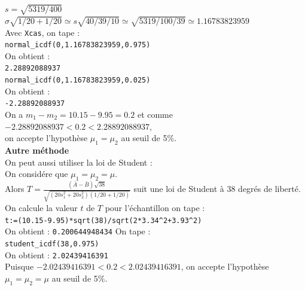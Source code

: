 \documentclass[a4paper,11pt]{book}
\begin{document}
\begin{itemize}
$s=\sqrt{5319/400}$\\
$\sigma\sqrt{1/20+1/20} \simeq s\sqrt{40/39/10}\simeq \sqrt{5319/100/39}\simeq 1.16783823959$\\
Avec {\tt Xcas}, on tape :\\
{\tt normal\_icdf(0,1.16783823959,0.975)}\\
On obtient :\\
{\tt 2.28892088937}\\
{\tt normal\_icdf(0,1.16783823959,0.025)}\\
On obtient :\\
{\tt -2.28892088937}\\
On a $m_1-m_2=10.15-9.95=0.2$ et comme \\
$ -2.28892088937<0.2< 2.28892088937$,\\
 on accepte l'hypoth\`ese $\mu_1=\mu_2$ au seuil de 5\%.\\
{\bf Autre m\'ethode}\\
On peut aussi utiliser la loi de Student :\\
On consid\'ere que $\mu_1=\mu_2=\mu$.\\
Alors $\displaystyle T=\frac{(\bar A- \bar B)\sqrt{38}}{\sqrt{(20s_1^2+20s_2^2)(1/20+1/20)}}$ suit une loi 
de Student \`a 38 degr\'es de libert\'e.\\
On calcule la valeur $t$ de $T$ pour l'\'echantillon on tape  :\\
{\tt t:=(10.15-9.95)*sqrt(38)/sqrt(2*3.34\verb|^|2+3.93\verb|^|2)}\\
On obtient : {\tt 0.200644948434}
On tape :\\
{\tt student\_icdf(38,0.975)}\\
On obtient : {\tt 2.02439416391}\\
Puisque $-2.02439416391<0.2<2.02439416391$, on accepte l'hypoth\`ese $\mu_1=\mu_2=\mu$ au seuil de 5\%.


\end{itemize}
\end{document}
